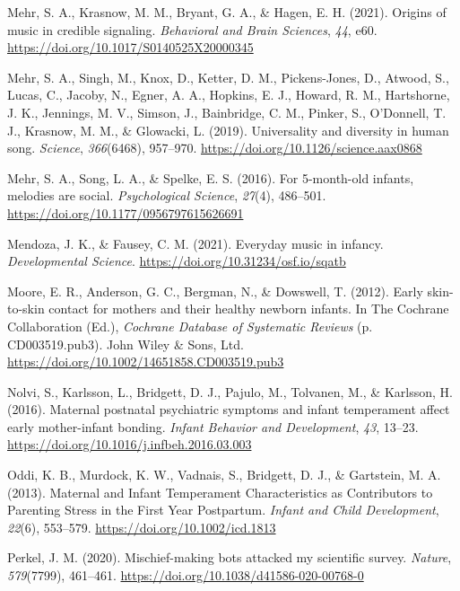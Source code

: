 \documentclass[
]{article}
\newlength{\cslhangindent}
\newenvironment{CSLReferences}[2] %
 {\begin{list}{}{%
  \setlength{\itemindent}{0pt}
  \setlength{\leftmargin}{0pt}
  \setlength{\parsep}{0pt}
  \ifodd #1
   \setlength{\leftmargin}{\cslhangindent}
   \setlength{\itemindent}{-1\cslhangindent}
  \fi
  \setlength{\itemsep}{#2\baselineskip}}}
 {\end{list}}
\begin{document}
\begin{CSLReferences}{1}{0}
Mehr, S. A., Krasnow, M. M., Bryant, G. A., \& Hagen, E. H. (2021).
Origins of music in credible signaling. \emph{Behavioral and Brain
Sciences}, \emph{44}, e60.
\url{https://doi.org/10.1017/S0140525X20000345}

Mehr, S. A., Singh, M., Knox, D., Ketter, D. M., Pickens-Jones, D.,
Atwood, S., Lucas, C., Jacoby, N., Egner, A. A., Hopkins, E. J., Howard,
R. M., Hartshorne, J. K., Jennings, M. V., Simson, J., Bainbridge, C.
M., Pinker, S., O'Donnell, T. J., Krasnow, M. M., \& Glowacki, L.
(2019). Universality and diversity in human song. \emph{Science},
\emph{366}(6468), 957--970.
\url{https://doi.org/10.1126/science.aax0868}

Mehr, S. A., Song, L. A., \& Spelke, E. S. (2016). For 5-month-old
infants, melodies are social. \emph{Psychological Science},
\emph{27}(4), 486--501. \url{https://doi.org/10.1177/0956797615626691}

Mendoza, J. K., \& Fausey, C. M. (2021). Everyday music in infancy.
\emph{Developmental Science}.
\url{https://doi.org/10.31234/osf.io/sqatb}

Moore, E. R., Anderson, G. C., Bergman, N., \& Dowswell, T. (2012).
Early skin-to-skin contact for mothers and their healthy newborn
infants. In The Cochrane Collaboration (Ed.), \emph{Cochrane {Database}
of {Systematic Reviews}} (p. CD003519.pub3). John Wiley \& Sons, Ltd.
\url{https://doi.org/10.1002/14651858.CD003519.pub3}

Nolvi, S., Karlsson, L., Bridgett, D. J., Pajulo, M., Tolvanen, M., \&
Karlsson, H. (2016). Maternal postnatal psychiatric symptoms and infant
temperament affect early mother-infant bonding. \emph{Infant Behavior
and Development}, \emph{43}, 13--23.
\url{https://doi.org/10.1016/j.infbeh.2016.03.003}

Oddi, K. B., Murdock, K. W., Vadnais, S., Bridgett, D. J., \& Gartstein,
M. A. (2013). Maternal and {Infant Temperament Characteristics} as
{Contributors} to {Parenting Stress} in the {First Year Postpartum}.
\emph{Infant and Child Development}, \emph{22}(6), 553--579.
\url{https://doi.org/10.1002/icd.1813}

Perkel, J. M. (2020). Mischief-making bots attacked my scientific
survey. \emph{Nature}, \emph{579}(7799), 461--461.
\url{https://doi.org/10.1038/d41586-020-00768-0}


\end{CSLReferences}
\end{document}
